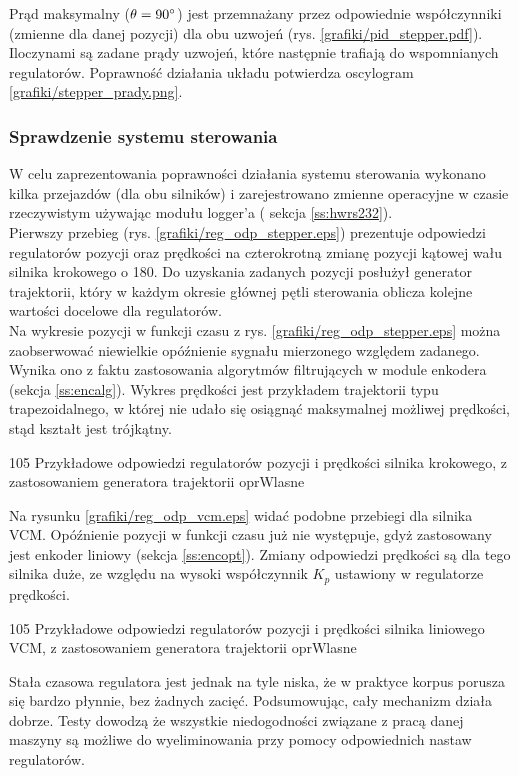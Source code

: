 Prąd maksymalny ($ \theta = 90\degree $) jest przemnażany przez odpowiednie współczynniki (zmienne dla danej pozycji) dla obu uzwojeń (rys. \ref{grafiki/pid_stepper.pdf}). Iloczynami są zadane prądy uzwojeń, które następnie trafiają do wspomnianych regulatorów. Poprawność działania układu potwierdza oscylogram \ref{grafiki/stepper_prady.png}.
	
\clearpage
	
\subsubsection{Sprawdzenie systemu sterowania}

W celu zaprezentowania poprawności działania systemu sterowania wykonano kilka przejazdów (dla obu silników) i zarejestrowano zmienne operacyjne w czasie rzeczywistym używając modułu logger'a ( sekcja \ref{ss:hwrs232}). \\

Pierwszy przebieg (rys. \ref{grafiki/reg_odp_stepper.eps}) prezentuje odpowiedzi regulatorów pozycji oraz prędkości na czterokrotną zmianę pozycji kątowej wału silnika krokowego o 180\degree. Do uzyskania zadanych pozycji posłużył generator trajektorii, który w każdym okresie głównej pętli sterowania oblicza kolejne wartości docelowe dla regulatorów. \\
 
Na wykresie pozycji w funkcji czasu z rys. \ref{grafiki/reg_odp_stepper.eps} można zaobserwować niewielkie opóźnienie sygnału mierzonego względem zadanego. Wynika ono z faktu zastosowania algorytmów filtrujących w module enkodera (sekcja \ref{ss:encalg}). Wykres prędkości jest przykładem trajektorii typu trapezoidalnego, w której nie udało się osiągnąć maksymalnej możliwej prędkości, stąd kształt jest trójkątny.

	{105}
	{Przykładowe odpowiedzi regulatorów pozycji i prędkości silnika krokowego, z zastosowaniem generatora trajektorii}
	{oprWlasne}
	
Na rysunku \ref{grafiki/reg_odp_vcm.eps} widać podobne przebiegi dla silnika VCM. Opóźnienie pozycji w funkcji czasu już nie występuje, gdyż zastosowany jest enkoder liniowy (sekcja \ref{ss:encopt}). Zmiany odpowiedzi prędkości są dla tego silnika duże, ze względu na wysoki współczynnik $ K_p $ ustawiony w regulatorze prędkości.

\clearpage
	
	{105}
	{Przykładowe odpowiedzi regulatorów pozycji i prędkości silnika liniowego VCM, z zastosowaniem generatora trajektorii}
	{oprWlasne}
	
Stała czasowa regulatora jest jednak na tyle niska, że w praktyce korpus porusza się bardzo płynnie, bez żadnych zacięć. Podsumowując, cały mechanizm działa dobrze. Testy dowodzą że wszystkie niedogodności związane z pracą danej maszyny są możliwe do wyeliminowania przy pomocy odpowiednich nastaw regulatorów.

